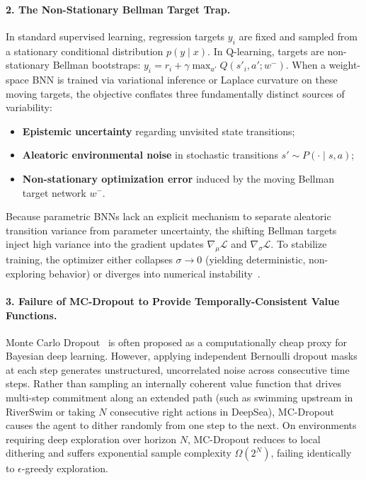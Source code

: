 \documentclass[10pt]{article}
\begin{document}
\paragraph{2. The Non-Stationary Bellman Target Trap.}
In standard supervised learning, regression targets $y_i$ are fixed and sampled from a stationary conditional distribution $p(y \mid x)$. In Q-learning, targets are non-stationary Bellman bootstraps: $y_i = r_i + \gamma \max_{a'} Q(s'_i, a'; w^-)$. When a weight-space BNN is trained via variational inference or Laplace curvature on these moving targets, the objective conflates three fundamentally distinct sources of variability:
\begin{itemize}
    \item \textbf{Epistemic uncertainty} regarding unvisited state transitions;
    \item \textbf{Aleatoric environmental noise} in stochastic transitions $s' \sim P(\cdot \mid s, a)$;
    \item \textbf{Non-stationary optimization error} induced by the moving Bellman target network $w^-$.
\end{itemize}
Because parametric BNNs lack an explicit mechanism to separate aleatoric transition variance from parameter uncertainty, the shifting Bellman targets inject high variance into the gradient updates $\nabla_\mu \mathcal{L}$ and $\nabla_\sigma \mathcal{L}$. To stabilize training, the optimizer either collapses $\sigma \to 0$ (yielding deterministic, non-exploring behavior) or diverges into numerical instability~\citep{osband2019deep, dwarakanath2020limitations}.

\paragraph{3. Failure of MC-Dropout to Provide Temporally-Consistent Value Functions.}
Monte Carlo Dropout~\citep{gal2016dropout} is often proposed as a computationally cheap proxy for Bayesian deep learning. However, applying independent Bernoulli dropout masks at each step generates unstructured, uncorrelated noise across consecutive time steps. Rather than sampling an internally coherent value function that drives multi-step commitment along an extended path (such as swimming upstream in RiverSwim or taking $N$ consecutive right actions in DeepSea), MC-Dropout causes the agent to dither randomly from one step to the next. On environments requiring deep exploration over horizon $N$, MC-Dropout reduces to local dithering and suffers exponential sample complexity $\Omega(2^N)$, failing identically to $\epsilon$-greedy exploration.
\end{document}
